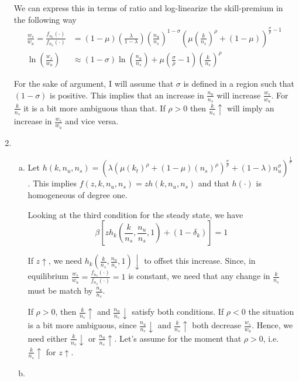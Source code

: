 \documentclass[12pt]{article}
\newcommand{\1}{{\bf 1}} %
\begin{document}
\begin{enumerate}[(1)]
	We can express this in terms of ratio and log-linearize the skill-premium in the following way
				\begin{equation*}
	\begin{aligned}
	\frac{w_s}{w_u}=\frac{f_{n_s}(\cdot)}{f_{n_u}(\cdot)} &= (1-\mu)\left( \frac{\lambda}{1-\lambda}\right)  \left( \frac{n_u}{n_s}\right)^{1-\sigma}  \left( \mu\left( \frac{k}{n_s}\right)^{\rho}+(1-\mu)\right) ^{\frac{\sigma}{\rho}-1}\\
	\ln\left( \frac{w_s}{w_u} \right) & \approx (1-\sigma) \ln \left( \frac{n_u}{n_s}\right) + \mu \left( \frac{\sigma}{\rho}-1\right)  \left( \frac{k}{n_s}\right) ^{\rho}
	\end{aligned}
	\end{equation*}
	
	For the sake of argument, I will assume that $\sigma$ is defined in a region such that $(1-\sigma)$ is positive. This implies that an increase in $\frac{n_u}{n_s}$ will increase $\frac{w_s}{w_u}$. For $\frac{k}{n_s}$ it is a bit more ambiguous than that. If $\rho>0$ then $ \frac{k}{n_s}\uparrow$ will imply an increase in $\frac{w_s}{w_u}$ and vice versa.
	\item 
	\begin{enumerate}[(a)]
		\item 
		
		Let $h(k,n_{u},n_{s})= (\lambda(\mu(k_t)^{\rho}+(1-\mu)(n_s)^{\rho})^{\frac{\sigma}{\rho}}+(1-\lambda)n_u^{\sigma})^{\frac{1}{\sigma}}$. This implies $f(z,k,n_{u},n_{s})=zh(k,n_{u},n_{s})$ and that $h(\cdot)$ is homogeneous of degree one.
		
		Looking at the third condition for the steady state, we have
				\[
		\beta \left[  zh_k\left( \frac{k}{n_s},\frac{n_u}{n_s},1\right) +(1-\delta_k)\right]  =1
		\]
		
		If $z\uparrow$, we need $h_k\left( \frac{k}{n_s},\frac{n_u}{n_s},1\right) \downarrow$ to offset this increase. Since, in equilibrium 
		$\frac{w_s}{w_u}=\frac{f_{n_s}(\cdot)}{f_{n_u}(\cdot)} = 1$ is constant, we need that any change in $ \frac{k}{n_s}$ must be match by $\frac{n_u}{n_s}$.
		
		If $\rho>0$, then $ \frac{k}{n_s} \uparrow$ and $\frac{n_u}{n_s} \downarrow$ satisfy both conditions. If $\rho<0$ the situation is a bit more ambiguous, since $\frac{n_u}{n_s} \downarrow$ and $ \frac{k}{n_s} \uparrow$ both decrease $\frac{w_s}{w_u}$. Hence, we need either $ \frac{k}{n_s} \downarrow$ or $\frac{n_u}{n_s} \uparrow$. Let's assume for the moment that $\rho>0$, i.e. $ \frac{k}{n_s} \uparrow$ for $z\uparrow$.
		\item 
		

\end{enumerate}
\end{enumerate}
\end{document}
